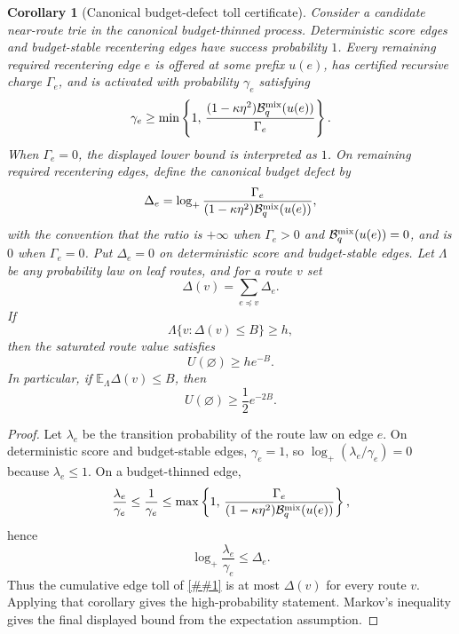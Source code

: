 \documentclass[10pt]{article}
\newcommand{\cref}[1]{\ref{##1}}
\newtheorem{corollary}[theorem]{Corollary}
\theoremstyle{definition}
\newcommand{\E}{\mathbb{E}}
\begin{document}
\begin{corollary}[Canonical budget-defect toll certificate]
   \label{cor:canonical-budget-defect-toll}
   Consider a candidate near-route trie in the canonical budget-thinned
   process.  Deterministic score edges and budget-stable recentering edges have
   success probability \(1\).  Every remaining required recentering edge \(e\)
   is offered at some prefix \(u(e)\), has certified recursive charge
   \(\Gamma_e\), and is activated with probability \(\gamma_e\) satisfying
   \[
      \gamma_e\ge
      \min\left\{
         1,\,
         \frac{(1-\kappa\eta^2)
               \mathcal B_q^{\rm mix}(u(e))}
              {\Gamma_e}
      \right\}.
   \]
   When \(\Gamma_e=0\), the displayed lower bound is interpreted as \(1\).
   On remaining required recentering edges, define the canonical budget defect
   by
   \[
      \Delta_e
      =
      \log_+
      \frac{\Gamma_e}
           {(1-\kappa\eta^2)\mathcal B_q^{\rm mix}(u(e))},
   \]
   with the convention that the ratio is \(+\infty\) when
   \(\Gamma_e>0\) and \(\mathcal B_q^{\rm mix}(u(e))=0\), and is \(0\) when
   \(\Gamma_e=0\).
   Put \(\Delta_e=0\) on deterministic score and budget-stable edges.
   Let \(\Lambda\) be any probability law on leaf routes, and for a route \(v\)
   set
   \[
      \Delta(v)=\sum_{e\preceq v}\Delta_e .
   \]
   If
   \[
      \Lambda\{v:\Delta(v)\le B\}\ge h,
   \]
   then the saturated route value satisfies
   \[
      U(\varnothing)\ge h e^{-B}.
   \]
   In particular, if \(\E_\Lambda \Delta(v)\le B\), then
   \[
      U(\varnothing)\ge \frac12e^{-2B}.
   \]
\end{corollary}

\begin{proof}
   Let \(\lambda_e\) be the transition probability of the route law on edge
   \(e\).  On deterministic score and budget-stable edges, \(\gamma_e=1\), so
   \(\log_+(\lambda_e/\gamma_e)=0\) because \(\lambda_e\le1\).  On a
   budget-thinned edge,
   \[
      \frac{\lambda_e}{\gamma_e}
      \le
      \frac1{\gamma_e}
      \le
      \max\left\{
         1,\,
         \frac{\Gamma_e}
              {(1-\kappa\eta^2)\mathcal B_q^{\rm mix}(u(e))}
      \right\},
   \]
   hence
   \[
      \log_+\frac{\lambda_e}{\gamma_e}\le\Delta_e .
   \]
   Thus the cumulative edge toll of \cref{cor:typical-route-law-toll} is at
   most \(\Delta(v)\) for every route \(v\).  Applying that corollary gives the
   high-probability statement.  Markov's inequality gives the final displayed
   bound from the expectation assumption.
\end{proof}
\end{document}

